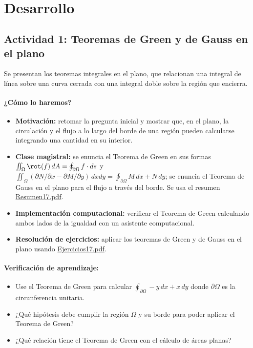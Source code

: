 \documentclass[a4,11pt]{aleph-notas}
\begin{document}
\section*{Desarrollo}

\subsection*{Actividad 1: Teoremas de Green y de Gauss en el plano}
Se presentan los teoremas integrales en el plano, que relacionan una integral de línea sobre una curva cerrada con una integral doble sobre la región que encierra.

\paragraph{¿Cómo lo haremos?}
\begin{itemize}[leftmargin=*]
    \item \textbf{Motivación:} retomar la pregunta inicial y mostrar que, en el plano, la circulación y el flujo a lo largo del borde de una región pueden calcularse integrando una cantidad en su interior.
    \item \textbf{Clase magistral:} se enuncia el Teorema de Green en sus formas $\iint_\Omega \rot(f)\,dA=\oint_{\partial\Omega} f\cdot ds$ y $\iint_\Omega(\partial N/\partial x-\partial M/\partial y)\,dxdy=\oint_{\partial\Omega} M\,dx+N\,dy$; se enuncia el Teorema de Gauss en el plano para el flujo a través del borde. Se usa el resumen \href{https://andres-merino.github.io/MatematicaIII-05-N0051/01Resumen/Resumen17.pdf}{Resumen17.pdf}.
    \item \textbf{Implementación computacional:} verificar el Teorema de Green calculando ambos lados de la igualdad con un asistente computacional.
    \item \textbf{Resolución de ejercicios:} aplicar los teoremas de Green y de Gauss en el plano usando \href{https://andres-merino.github.io/MatematicaIII-05-N0051/04Ejercicios/Ejercicios17.pdf}{Ejercicios17.pdf}.
\end{itemize}

\paragraph{Verificación de aprendizaje:}
\begin{itemize}[leftmargin=*]
    \item Use el Teorema de Green para calcular $\oint_{\partial\Omega} -y\,dx+x\,dy$ donde $\partial\Omega$ es la circunferencia unitaria.
    \item ¿Qué hipótesis debe cumplir la región $\Omega$ y su borde para poder aplicar el Teorema de Green?
    \item ¿Qué relación tiene el Teorema de Green con el cálculo de áreas planas?
\end{itemize}
\end{document}
